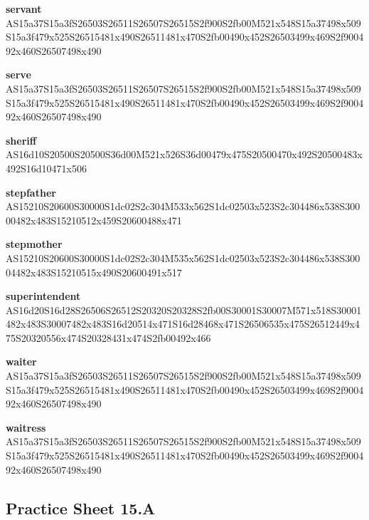 \documentclass{article}
\begin{document}
\begin{glossary}
\textbf{servant}\\
AS15a37S15a3fS26503S26511S26507S26515S2f900S2fb00M521x548S15a37498x509S15a3f479x525S26515481x490S26511481x470S2fb00490x452S26503499x469S2f900492x460S26507498x490

\textbf{serve}\\
AS15a37S15a3fS26503S26511S26507S26515S2f900S2fb00M521x548S15a37498x509S15a3f479x525S26515481x490S26511481x470S2fb00490x452S26503499x469S2f900492x460S26507498x490

\textbf{sheriff}\\
AS16d10S20500S20500S36d00M521x526S36d00479x475S20500470x492S20500483x492S16d10471x506

\textbf{stepfather}\\
AS15210S20600S30000S1dc02S2c304M533x562S1dc02503x523S2c304486x538S30000482x483S15210512x459S20600488x471

\textbf{stepmother}\\
AS15210S20600S30000S1dc02S2c304M535x562S1dc02503x523S2c304486x538S30004482x483S15210515x490S20600491x517

\textbf{superintendent}\\
AS16d20S16d28S26506S26512S20320S20328S2fb00S30001S30007M571x518S30001482x483S30007482x483S16d20514x471S16d28468x471S26506535x475S26512449x475S20320556x474S20328431x474S2fb00492x466

\textbf{waiter}\\
AS15a37S15a3fS26503S26511S26507S26515S2f900S2fb00M521x548S15a37498x509S15a3f479x525S26515481x490S26511481x470S2fb00490x452S26503499x469S2f900492x460S26507498x490

\textbf{waitress}\\
AS15a37S15a3fS26503S26511S26507S26515S2f900S2fb00M521x548S15a37498x509S15a3f479x525S26515481x490S26511481x470S2fb00490x452S26503499x469S2f900492x460S26507498x490

\end{glossary}

\subsection{Practice Sheet 15.A}
\end{document}
